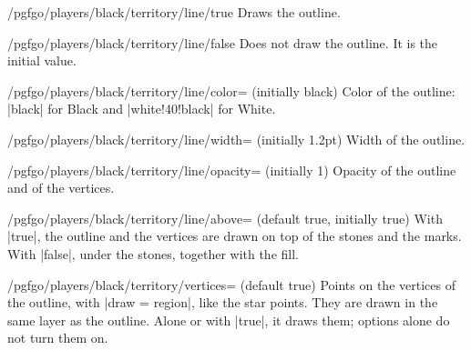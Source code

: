 	\begin{key}{/pgfgo/players/black/territory/line/true}
		Draws the outline.
	\end{key}

	\begin{key}{/pgfgo/players/black/territory/line/false}
		Does not draw the outline. It is the initial value.
	\end{key}

	\begin{key}{/pgfgo/players/black/territory/line/color= (initially black)}
		Color of the outline: |black| for Black and |white!40!black| for White.
	\end{key}

	\begin{key}{/pgfgo/players/black/territory/line/width= (initially 1.2pt)}
		Width of the outline.
	\end{key}

	\begin{key}{/pgfgo/players/black/territory/line/opacity= (initially 1)}
		Opacity of the outline and of the vertices.
	\end{key}

	\begin{key}{/pgfgo/players/black/territory/line/above= (default true, initially true)}
		With |true|, the outline and the vertices are drawn on top of the stones and the marks. With |false|, under the stones, together with the fill.

		\begin{codeexample}[]
			\begin{goban}[5]
			\end{goban}

			\begin{goban}[5]
			\end{goban}
		\end{codeexample}
	\end{key}

	\begin{key}{/pgfgo/players/black/territory/vertices= (default true)}
		Points on the vertices of the outline, with |draw = region|, like the star points. They are drawn in the same layer as the outline. Alone or with |true|, it draws them; options alone do not turn them on.
	\end{key}

